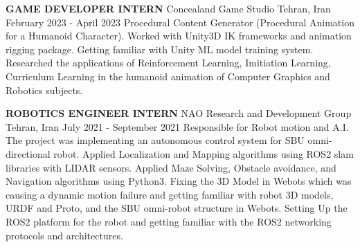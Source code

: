 \begin{cventries}
		
    \cventry
    {\textbf{GAME DEVELOPER INTERN}}
    {Concealand Game Studio}
    {Tehran, Iran}
    {February 2023 - April 2023}
    {Procedural Content Generator (Procedural Animation for a Humanoid Character). \newline Worked with Unity3D IK frameworks and animation rigging package. \newline Getting familiar with Unity ML model training system. \newline Researched the applications of Reinforcement Learning, Imitiation Learning, Curriculum Learning in the humanoid animation of Computer Graphics and Robotics subjects.}   
    
\vspace{0.7 cm}

    \cventry
    {\textbf{ROBOTICS ENGINEER INTERN}}
    {NAO Research and Development Group}
    {Tehran, Iran}
    {July 2021 - September 2021}
    {Responsible for Robot motion and A.I. \newline The project was implementing an autonomous control system for SBU omni-directional robot. Applied Localization and Mapping algorithms using ROS2 slam libraries with LIDAR sensors. \newline Applied Maze Solving, Obstacle avoidance, and Navigation algorithms using Python3. \newline Fixing the 3D Model in Webots which was causing a dynamic motion failure and getting familiar with robot 3D models, URDF and Proto, and the SBU omni-robot structure in Webots. \newline Setting Up the ROS2 platform for the robot and getting familiar with the ROS2 networking protocols and architectures.}   
    
\end{cventries}

